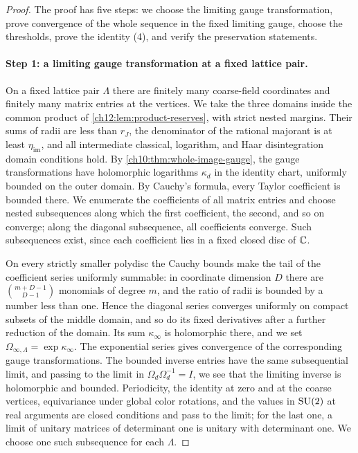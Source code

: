\begin{proof}
The proof has five steps: we choose the limiting gauge transformation, prove convergence of the whole sequence in the fixed limiting gauge, choose the thresholds, prove the identity (4), and verify the preservation statements.

\paragraph{Step 1: a limiting gauge transformation at a fixed lattice pair.}
On a fixed lattice pair $\Lambda$ there are finitely many coarse-field coordinates and finitely many matrix entries at the vertices. We take the three domains inside the common product of \cref{ch12:lem:product-reserves}, with strict nested margins. Their sums of radii are less than $r_J$, the denominator of the rational majorant is at least $\eta_{\mathrm{im}}$, and all intermediate classical, logarithm, and Haar disintegration domain conditions hold. By \cref{ch10:thm:whole-image-gauge}, the gauge transformations have holomorphic logarithms $\kappa_d$ in the identity chart, uniformly bounded on the outer domain. By Cauchy's formula, every Taylor coefficient is bounded there. We enumerate the coefficients of all matrix entries and choose nested subsequences along which the first coefficient, the second, and so on converge; along the diagonal subsequence, all coefficients converge. Such subsequences exist, since each coefficient lies in a fixed closed disc of $\mathbb C$.

On every strictly smaller polydisc the Cauchy bounds make the tail of the coefficient series uniformly summable: in coordinate dimension $D$ there are $\binom{m+D-1}{D-1}$ monomials of degree $m$, and the ratio of radii is bounded by a number less than one. Hence the diagonal series converges uniformly on compact subsets of the middle domain, and so do its fixed derivatives after a further reduction of the domain. Its sum $\kappa_\infty$ is holomorphic there, and we set $\Omega_{\infty,\Lambda}=\exp\kappa_\infty$. The exponential series gives convergence of the corresponding gauge transformations. The bounded inverse entries have the same subsequential limit, and passing to the limit in $\Omega_d\Omega_d^{-1}=I$, we see that the limiting inverse is holomorphic and bounded. Periodicity, the identity at zero and at the coarse vertices, equivariance under global color rotations, and the values in $\mathrm{SU}(2)$ at real arguments are closed conditions and pass to the limit; for the last one, a limit of unitary matrices of determinant one is unitary with determinant one. We choose one such subsequence for each $\Lambda$.


\end{proof}
